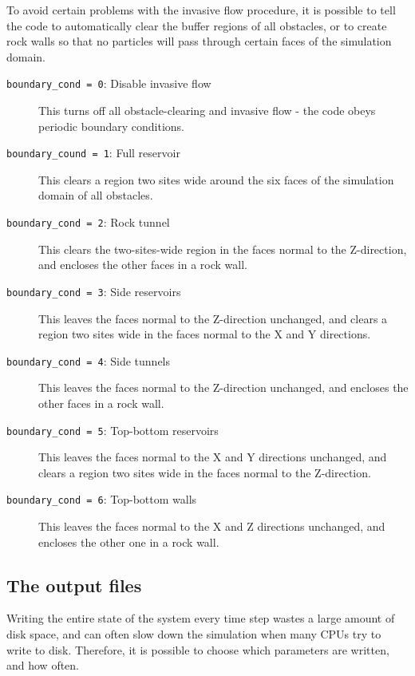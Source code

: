 \documentclass[a4paper]{article}
\begin{document}
To avoid certain problems with the invasive flow procedure, it is
possible to tell the code to automatically clear the buffer regions of
all obstacles, or to create rock walls so that no particles will pass
through certain faces of the simulation domain.

\begin{description}

	\item[{\tt boundary\_cond = 0}: Disable invasive flow]
		This turns off all obstacle-clearing and invasive flow -
		the code obeys periodic boundary conditions.

	\item[{\tt boundary\_cound = 1}: Full reservoir]
		This clears a region two sites wide around the six faces
		of the simulation domain of all obstacles.
	
	\item[{\tt boundary\_cond = 2}: Rock tunnel]
		This clears the two-sites-wide region in the faces
		normal to the Z-direction, and encloses the other faces
		in a rock wall.
	\item[{\tt boundary\_cond = 3}: Side reservoirs]
		This leaves the faces normal to the Z-direction
		unchanged, and clears a region two sites wide in the
		faces normal to the X and Y directions.
	\item[{\tt boundary\_cond = 4}: Side tunnels]
		This leaves the faces normal to the Z-direction
		unchanged, and encloses the other faces in a rock wall.
	\item[{\tt boundary\_cond = 5}: Top-bottom reservoirs]
		This leaves the faces normal to the X and Y directions
		unchanged, and clears a region two sites wide in the
		faces normal to the Z-direction.
	\item[{\tt boundary\_cond = 6}: Top-bottom walls]
		This leaves the faces normal to the X and Z directions
		unchanged, and encloses the other one in a rock wall.

\end{description}


\subsection{The output files}
\label{OUTPUT-FILES}

Writing the entire state of the system every time step wastes a large
amount of disk space, and can often slow down the simulation when many
CPUs try to write to disk. Therefore, it is possible to choose which
parameters are written, and how often.
\end{document}
